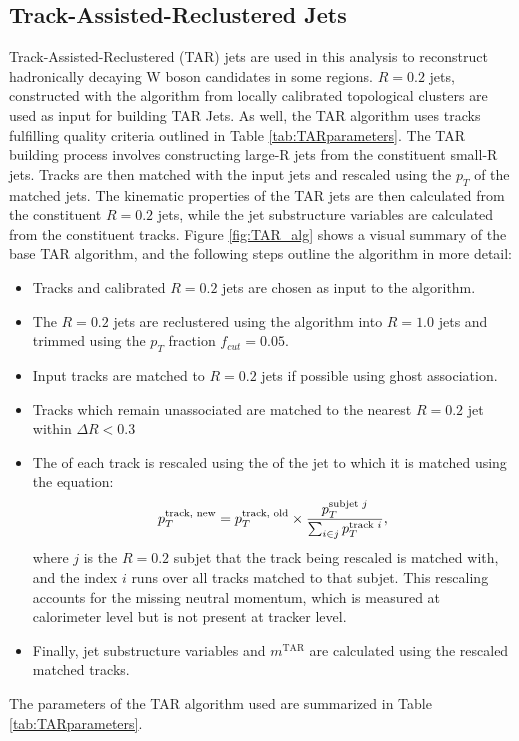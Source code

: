 \subsection{Track-Assisted-Reclustered Jets}
\label{ap:TARjet_object_defs}
Track-Assisted-Reclustered (TAR) jets \cite{TAR} are used in this analysis to reconstruct hadronically decaying W boson candidates in some regions. $R=0.2$ jets, constructed with the \akt algorithm \cite{antikt} from locally calibrated topological clusters \cite{TopoClusters} are used as input for building TAR Jets. As well, the TAR algorithm uses tracks fulfilling quality criteria outlined in Table \ref{tab:TARparameters}. The TAR building process involves constructing large-R jets from the constituent small-R jets. Tracks are then matched with the input jets and rescaled using the $p_T$ of the matched jets. The kinematic properties of the TAR jets are then calculated from the constituent $R=0.2$ jets, while the jet substructure variables are calculated from the constituent tracks. Figure \ref{fig:TAR_alg} shows a visual summary of the base TAR algorithm, and
the following steps outline the algorithm in more detail:
\begin{itemize}
  \item Tracks and calibrated \akt $R=0.2$ jets are chosen as input to the algorithm.
  \item The \akt $R=0.2$ jets are reclustered using the \akt algorithm into $R=1.0$ jets and trimmed using the $p_T$ fraction \(f_{cut}=0.05\).
  \item Input tracks are matched to $R=0.2$ jets if possible using ghost association.
  \item Tracks which remain unassociated are matched to the nearest \akt $R=0.2$ jet within $\Delta R<0.3$
  \item The \pT of each track is rescaled using the \pT of the jet to which it is matched using the equation:
  \begin{equation}
  p_T^{\text{track, new}} = p_T^{\text{track, old}}\times \frac{p_T^{\text{subjet $j$}}}{\sum_{i \in j} p_T^{\text{track $i$}}} ,
  \label{eq:TAR_rescale}
  \end{equation}  where $j$ is the $R=0.2$ subjet that the track being rescaled is matched with, and the index $i$ runs over all tracks matched to that subjet. This rescaling accounts for the missing neutral momentum, which is measured at calorimeter level but is not present at tracker level.
  \item Finally, jet substructure variables and $m^\text{TAR}$ are calculated using the rescaled matched tracks.
\end{itemize}
The parameters of the TAR algorithm used are summarized in Table \ref{tab:TARparameters}. \\


